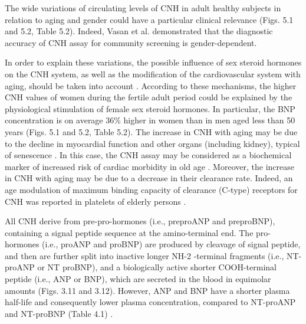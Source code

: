\documentclass[14pt,a4paper,onecolumn]{extarticle}
\begin{document}
The wide variations of circulating levels of CNH in adult healthy subjects in relation to aging and gender could have a particular clinical relevance \citep{bib37} \citep{bib38} \citep{bib39} \citep{bib310} (Figs. 5.1 and 5.2, Table 5.2). Indeed, Vasan et al. \citep{bib39} demonstrated that the diagnostic accuracy of CNH assay for community screening is gender-dependent.

In order to explain these variations, the possible influence of sex steroid hormones on the CNH system, as well as the modification of the cardiovascular system with aging, should be taken into account \citep{bib311} \citep{bib312} \citep{bib313} \citep{bib314}. According to these mechanisms, the higher CNH values of women during the fertile adult period could be explained by the physiological stimulation of female sex steroid hormones. In particular, the BNP concentration is on average 36\% higher in women than in men aged less than 50 years \citep{bib37} (Figs. 5.1 and 5.2, Table 5.2). The increase in CNH with aging may be due to the decline in myocardial function and other organs (including kidney), typical of senescence \citep{bib315}. In this case, the CNH assay may be considered as a biochemical marker of increased risk of cardiac morbidity in old age \citep{bib316}. Moreover, the increase in CNH with aging may be due to a decrease in their clearance rate. Indeed, an age modulation of maximum binding capacity of clearance (C-type) receptors for CNH was reported in platelets of elderly persons \citep{bib317}.



All CNH derive from pre-pro-hormones (i.e., preproANP and preproBNP), containing a signal peptide sequence at the amino-terminal end. The pro-hormones (i.e., proANP and proBNP) are produced by cleavage of signal peptide, and then are further split into inactive longer NH-2 -terminal fragments (i.e., NT-proANP or NT proBNP), and a biologically active shorter COOH-terminal peptide (i.e., ANP or BNP), which are secreted in the blood in equimolar amounts (Figs. 3.11 and 3.12). However, ANP and BNP have a shorter plasma half-life and consequently lower plasma concentration, compared to NT-proANP and NT-proBNP (Table 4.1) \citep{bib31} \citep{bib32} \citep{bib33} \citep{bib34} \citep{bib35} \citep{bib36} \citep{bib37} \citep{bib318}.
\end{document}
